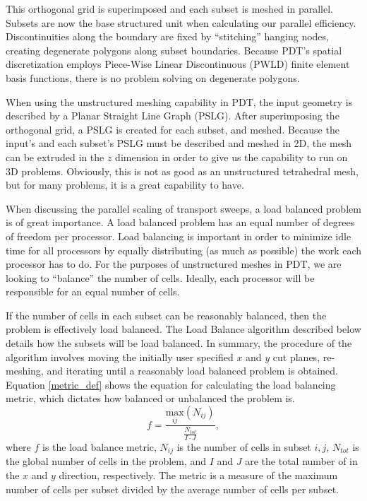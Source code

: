 \documentclass{anstrans}
\begin{document}
This orthogonal grid is superimposed and each subset is meshed in parallel.  Subsets are now the base structured unit when calculating our parallel efficiency. Discontinuities along the boundary are fixed by ``stitching'' hanging nodes, creating degenerate polygons along subset boundaries. Because PDT's spatial discretization employs Piece-Wise Linear Discontinuous (PWLD) finite element basis functions, there is no problem solving on degenerate polygons. 

When using the unstructured meshing capability in PDT, the input geometry is described by a Planar Straight Line Graph (PSLG). After superimposing the orthogonal grid, a PSLG is created for each subset, and meshed. Because the input's and each subset's PSLG must be described and meshed in 2D, the mesh can be extruded in the $z$ dimension in order to give us the capability to run on 3D problems. Obviously, this is not as good as an unstructured tetrahedral mesh, but for many problems, it is a great capability to have. 

When discussing the parallel scaling of transport sweeps, a load balanced problem is of great importance. A load balanced problem has an equal number of degrees of freedom per processor. Load balancing is important in order to minimize idle time for all processors by equally distributing (as much as possible) the work each processor has to do.  For the purposes of unstructured meshes in PDT, we are looking to ``balance'' the number of cells. Ideally, each processor will be responsible for an equal number of cells. 

If the number of cells in each subset can be reasonably balanced, then the problem is effectively load balanced. The Load Balance algorithm described below details how the subsets will be load balanced. In summary, the procedure of the algorithm involves moving the initially user specified $x$ and $y$ cut planes, re-meshing, and iterating until a reasonably load balanced problem is obtained.  Equation \ref{metric_def} shows the equation for calculating the load balancing metric, which dictates how balanced or unbalanced the problem is.
\begin{equation}
f =\frac{\underset{ij}{\text{max}}(N_{ij})}{\frac{N_{tot}}{I\cdot J}},
\label{metric_def}
\end{equation}
where $f$ is the load balance metric, $N_{ij}$ is the number of cells in subset $i,j$, $N_{tot}$ is the global number of cells in the problem, and $I$ and $J$ are the total number of in the $x$ and $y$ direction, respectively. The metric is a measure of the maximum number of cells per subset divided by the average number of cells per subset.
\end{document}
